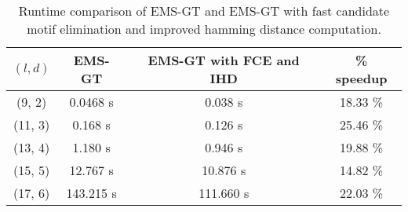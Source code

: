 \begin{table}[h] %
	\renewcommand{\arraystretch}{1.3}
	\centering
	\begin{tabular}{|c|c|c|c|}
	\hline 
	\bfseries\boldmath $(l,d)$ & 
	\bfseries\boldmath EMS-GT & 
	\bfseries\boldmath EMS-GT with FCE and IHD & 
	\bfseries \% speedup\\
	\hline
	(9, 2) & 0.0468 s &		0.038 s 	&	18.33 \%\\
	(11, 3) & 0.168 s &		0.126 s 	&	25.46 \%\\
	(13, 4) & 1.180 s &		0.946 s 	&	19.88 \%\\
	(15, 5) & 12.767 s &	10.876 s  	&	14.82 \%\\
	(17, 6) & 143.215 s &	111.660 s 	&	22.03 \%\\
	\hline\end{tabular}
	
	\caption{Runtime comparison of EMS-GT and EMS-GT with fast candidate motif elimination and improved hamming distance computation.}
	\label{tbl:ems-gt-fce-hd-speedup}
\end{table}


